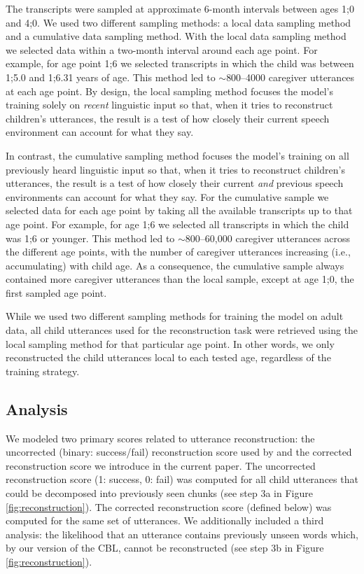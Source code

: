 \documentclass{article}
\begin{document}
The transcripts were sampled at approximate 6-month intervals between ages 1;0 and 4;0. We used two different sampling methods: a local data sampling method and a cumulative data sampling method. With the local data sampling method we selected data within a two-month interval around each age point. For example, for age point 1;6 we selected transcripts in which the child was between 1;5.0 and 1;6.31 years of age. This method led to $\sim$800--4000 caregiver utterances at each age point. By design, the local sampling method focuses the model's training solely on \textit{recent} linguistic input so that, when it tries to reconstruct children's utterances, the result is a test of how closely their current speech environment can account for what they say.

In contrast, the cumulative sampling method focuses the model's training on all previously heard linguistic input so that, when it tries to reconstruct children's utterances, the result is a test of how closely their current \textit{and} previous speech environments can account for what they say. For the cumulative sample we selected data for each age point by taking all the available transcripts up to that age point. For example, for age 1;6 we selected all transcripts in which the child was 1;6 or younger. This method led to $\sim$800--60,000 caregiver utterances across the different age points, with the number of caregiver utterances increasing (i.e., accumulating) with child age. As a consequence, the cumulative sample always contained more caregiver utterances than the local sample, except at age 1;0, the first sampled age point.

While we used two different sampling methods for training the model on adult data, all child utterances used for the reconstruction task were retrieved using the local sampling method for that particular age point. In other words, we only reconstructed the child utterances local to each tested age, regardless of the training strategy.

\subsection{Analysis}

We modeled two primary scores related to utterance reconstruction: the uncorrected (binary: success/fail) reconstruction score used by  and the corrected reconstruction score we introduce in the current paper. The uncorrected reconstruction score (1: success, 0: fail) was computed for all child utterances that could be decomposed into previously seen chunks (see step 3a in Figure \ref{fig:reconstruction}). The corrected reconstruction score (defined below) was computed for the same set of utterances. We additionally included a third analysis: the likelihood that an utterance contains previously unseen words which, by our version of the CBL, cannot be reconstructed (see step 3b in Figure \ref{fig:reconstruction}).
\end{document}
